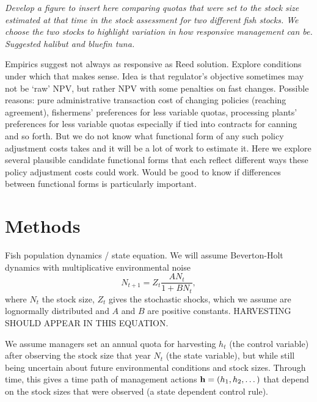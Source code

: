 \documentclass{article}\usepackage[]{graphicx}\usepackage[]{color}
\begin{document}
\emph{Develop a figure to insert here comparing quotas that were set to the stock size estimated at that time in the stock assessment for two different fish stocks. We choose the two stocks to highlight variation in how responsive management can be. Suggested halibut and bluefin tuna.}

Empirics suggest not always as responsive as Reed solution. Explore conditions under which that makes sense. Idea is that regulator’s objective sometimes may not be `raw' NPV, but rather NPV with some penalties on fast changes. Possible reasons: pure administrative transaction cost of changing policies (reaching agreement), fishermens' preferences for less variable quotas, processing plants' preferences for less variable quotas especially if tied into contracts for canning and so forth. But we do not know what functional form of any such policy adjustment costs takes and it will be a lot of work to estimate it. Here we explore several plausible candidate functional forms that each reflect different ways these policy adjustment costs could work. Would be good to know if differences between functional forms is particularly important.

\section{Methods}

 Fish population dynamics / state equation.  We will assume Beverton-Holt dynamics with multiplicative environmental noise
    \begin{equation} 
      N_{t+1} = Z_t \frac{A N_t}{1 + B N_t}, 
\label{eq:state_equation}
    \end{equation}
where $N_t$ the stock size, $Z_t$ gives the stochastic shocks, which we assume are lognormally distributed and $A$ and $B$ are positive constants. HARVESTING SHOULD APPEAR IN THIS EQUATION.

We assume managers set an annual quota for harvesting $h_t$ (the control variable) after observing the stock size that year $N_t$ (the state variable), but while still being uncertain about future environmental conditions and stock sizes. Through time, this gives a time path of management actions ${\bf h}=(h_1,h_2,\dots)$ that depend on the stock sizes that were observed (a state dependent control rule). 
\end{document}
